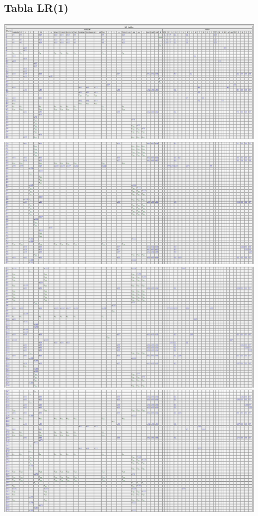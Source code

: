 \documentclass[11pt, , a4paper, titlepage]{article}
\newenvironment{changemargin}[2]{%
\begin{list}{}{%
\setlength{\topsep}{0pt}%
\setlength{\leftmargin}{#1}%
\setlength{\rightmargin}{#2}%
\setlength{\listparindent}{\parindent}%
\setlength{\itemindent}{\parindent}%
\setlength{\parsep}{\parskip}%
}%
\item[]}{\end{list}}
\begin{document}
\subsection{Tabla LR(1) }
\begin{changemargin}{-2.5cm}{+2.5cm}
    \begin{center}
        \includegraphics[width=1.27\textwidth]{./resources/tabla-LR/Tabla1.jpg}
        \includegraphics[width=1.27\textwidth]{./resources/tabla-LR/Tabla2.jpg}
        \includegraphics[width=1.27\textwidth]{./resources/tabla-LR/Tabla3.jpg}
        \includegraphics[width=1.27\textwidth]{./resources/tabla-LR/Tabla4.jpg}

\end{center}
\end{changemargin}
\end{document}
